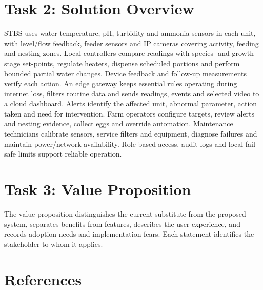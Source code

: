 \documentclass[lang=en,11pt,a4paper]{elegantpaper}
\begin{document}
\section{Task 2: Solution Overview}

STBS uses water-temperature, pH, turbidity and ammonia sensors in each unit, with level/flow feedback, feeder sensors and IP cameras covering activity, feeding and nesting zones. Local controllers compare readings with species- and growth-stage set-points, regulate heaters, dispense scheduled portions and perform bounded partial water changes. Device feedback and follow-up measurements verify each action. An edge gateway keeps essential rules operating during internet loss, filters routine data and sends readings, events and selected video to a cloud dashboard. Alerts identify the affected unit, abnormal parameter, action taken and need for intervention. Farm operators configure targets, review alerts and nesting evidence, collect eggs and override automation. Maintenance technicians calibrate sensors, service filters and equipment, diagnose failures and maintain power/network availability. Role-based access, audit logs and local fail-safe limits support reliable operation.

\section{Task 3: Value Proposition}

The value proposition distinguishes the current substitute from the proposed system, separates benefits from features, describes the user experience, and records adoption needs and implementation fears. Each statement identifies the stakeholder to whom it applies.

\begingroup
\small
\setlength{\tabcolsep}{2pt}
\setlength{\LTleft}{0pt}
\setlength{\LTright}{0pt}
\setlength{\LTcapwidth}{\textwidth}
\setlength{\LTpre}{0pt}
\setlength{\LTpost}{0pt}

\endgroup

\section{References}
\end{document}

